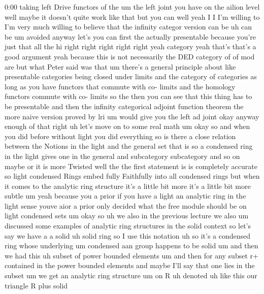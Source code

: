 \begin{unfinished}{0:00}
taking  left  Drive  functors  of  the  um  the
left  joint  you  have  on  the  ailion  level
well  maybe  it  doesn't  quite  work  like
that  but  you  can  well  yeah  I  I  I'm
willing  to  I'm  very  much  willing  to
believe  that  the  infinity  categor
version  can
be  uh  can  be  um  avoided  anyway
let's  you  can  first  the  actually
presentable  because  you're  just  that  all
the
hi  right  right  right  right  right  yeah
category  yeah  that's  that's  a  good
argument  yeah  because  this  is  not
necessarily  the  DED  category  of  of  mod
are  but  what  Peter  said  was  that  um
there's  a  general  principle  about  like
presentable  categories  being  closed
under  limits  and  the  category  of
categories  as  long  as  you  have  functors
that  commute  with  co-  limits  and  the
homology  functors  commute  with  co-
limits  so  the  then  you  can  see  that  this
thing  has  to  be  presentable  and  then  the
infinity  categorical  adjoint  function
theorem  the  more  naive  version  proved  by
lri  um  would  give  you  the  left  ad  joint
okay  anyway  enough  of  that  right  uh
let's  move  on  to  some  real  math  um
okay
so  and  when  you  did  before  without  light
you  did  everything  so  is  there  a  close
relation  between  the  Notions  in  the
light  and  the  general  set  that  is  so  a
condensed  ring  in  the  light  gives  one  in
the  general  and  subcategory  subcategory
and  so  on  maybe  or  it  is  more  Twisted
well  the  the  first  statement  is  is
completely  accurate  so  light  condensed
Rings  embed  fully  Faithfully  into  all
condensed  rings  but  when  it  comes  to  the
analytic  ring  structure  it's  a  little
bit  more  it's  a  little  bit  more
subtle
um  yeah  because  you  a  prior  if  you  have
a  light  an  analytic  ring  in  the  light
sense  youve  aior  a  prior  only  decided
what  the  free  module  should  be  on  light
condensed  sets
um  okay  so  uh  we  also  in  the  previous
lecture  we  also  um  discussed  some
examples  of  analytic  ring  structures  in
the  solid  context  so  let's  say  we  have  a
a  solid  uh  solid  ring  so  I  use  this
notation
uh  so  it's  a  condensed  ring  whose
underlying  um  condensed  aan  group
happens  to  be  solid  um  and  then  we  had
this  uh  subset  of  power  bounded
elements  um  and  then  for
any  subset  r+  contained  in  the  power
bounded  elements  and  maybe  I'll  say  that
one  lies  in  the  subset  um  we  get  an
analytic  ring
structure
um  on
R  uh
denoted
uh  like  this  our  triangle  R  plus  solid

\end{unfinished}
